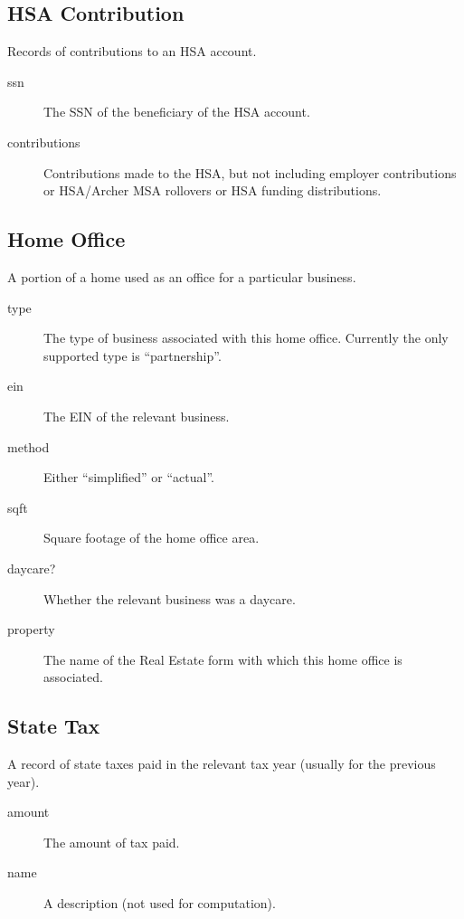\documentclass[12pt]{article}
\begin{document}
\subsection{HSA Contribution}

Records of contributions to an HSA account.

\begin{description}
\item[ssn] The SSN of the beneficiary of the HSA account.
\item[contributions] Contributions made to the HSA, but not including employer
contributions or HSA/Archer MSA rollovers or HSA funding distributions.
\end{description}

\subsection{Home Office}

A portion of a home used as an office for a particular business.

\begin{description}
\item[type] The type of business associated with this home office. Currently the
only supported type is ``partnership''.
\item[ein] The EIN of the relevant business.
\item[method] Either ``simplified'' or ``actual''.
\item[sqft] Square footage of the home office area.
\item[daycare?] Whether the relevant business was a daycare.
\item[property] The name of the Real Estate form with which this home office is
associated.
\end{description}

\subsection{State Tax}

A record of state taxes paid in the relevant tax year (usually for the previous
year).

\begin{description}
\item[amount] The amount of tax paid.
\item[name] A description (not used for computation).
\end{description}
\end{document}
